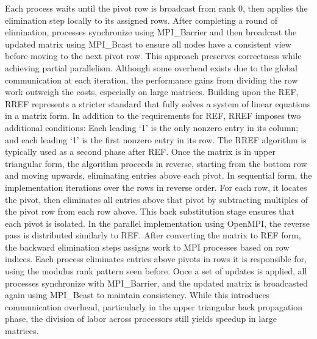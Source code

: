 \documentclass[12pt]{article}
\begin{document}
Each process waits until the pivot row is broadcast from rank 0, then applies the elimination step locally to its assigned rows. After completing a round of elimination, processes synchronize using MPI\_Barrier and then broadcast the updated matrix using MPI\_Bcast to ensure all nodes have a consistent view before moving to the next pivot row. This approach preserves correctness while achieving partial parallelism. Although some overhead exists due to the global communication at each iteration, the performance gains from dividing the row work outweigh the costs, especially on large matrices.
Building upon the REF, RREF represents a stricter standard that fully solves a system of linear equations in a matrix form. In addition to the requirements for REF, RREF imposes two additional conditions: Each leading ‘1’ is the only nonzero entry in its column; and each leading ‘1’ is the first nonzero entry in its row. The RREF algorithm is typically used as a second phase after REF. Once the matrix is in upper triangular form, the algorithm proceeds in reverse, starting from the bottom row and moving upwards, eliminating entries above each pivot. In sequential form, the implementation iterations over the rows in reverse order. For each row, it locates the pivot, then eliminates all entries above that pivot by subtracting multiples of the pivot row from each row above. This back substitution stage ensures that each pivot is isolated. In the parallel implementation using OpenMPI, the reverse pass is distributed similarly to REF. After converting the matrix to REF form, the backward elimination steps assigns work to MPI processes based on row indices. Each process eliminates entries above pivots in rows it is responsible for, using the modulus rank pattern seen before. Once a set of updates is applied, all processes synchronize with MPI\_Barrier, and the updated matrix is broadcasted again using MPI\_Bcast to maintain consistency. While this introduces communication overhead, particularly in the upper triangular back propagation phase, the division of labor across processors still yields speedup in large matrices. 
\end{document}
